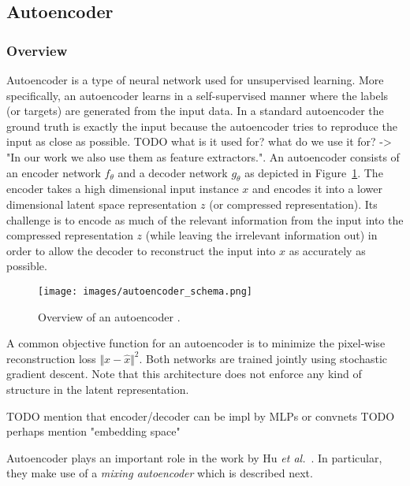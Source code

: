 \documentclass[12pt,a4paper]{article}
\begin{document}
\subsection{Autoencoder}
\subsubsection{Overview}
Autoencoder is a type of neural network used for unsupervised learning. More specifically, an autoencoder learns in a self-supervised manner where the labels (or targets) are generated from the input data. In a standard autoencoder the ground truth is exactly the input because the autoencoder tries to reproduce the input as close as possible. TODO what is it used for? what do we use it for? -> "In our work we also use them as feature extractors.". An autoencoder consists of an encoder network $f_{\theta}$ and a decoder network  $g_{\theta}$ as depicted in Figure~\ref{fig:autoencoder}. The encoder takes a high dimensional input instance $x$ and encodes it into a lower dimensional latent space representation $z$ (or compressed representation). Its challenge is to encode as much of the relevant information from the input into the compressed representation $z$ (while leaving the irrelevant information out) in order to allow the decoder to reconstruct the input into $\hat{x}$ as accurately as possible.
\begin{figure}[ht]
\centering
\texttt{[image: images/autoencoder\_schema.png]}
\caption{Overview of an autoencoder \cite{chollet_autoencoders}.}
\label{fig:autoencoder}
\end{figure}
A common objective function for an autoencoder is to minimize the pixel-wise reconstruction loss $\Vert x - \hat{x} \Vert^2$. Both networks are trained jointly using stochastic gradient descent. Note that this architecture does not enforce any kind of structure in the latent representation.

TODO mention that encoder/decoder can be impl by MLPs or convnets
TODO perhaps mention "embedding space"

Autoencoder plays an important role in the work by Hu \textit{et al.}~\cite{DisentFacOfVarByMixTh}. In particular, they make use of a \textit{mixing autoencoder} which is described next.
\end{document}
